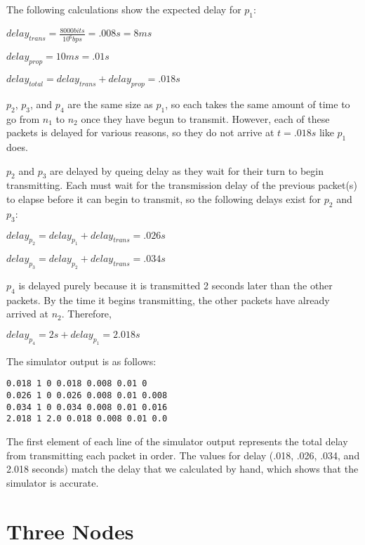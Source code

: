 \documentclass[11pt]{article}
\begin{document}
\begin{description}
The following calculations show the expected delay for $p_1$:

$delay_{trans} = \frac{8000 bits}{10^{6}bps} = .008s = 8ms$

$delay_{prop} = 10ms = .01s$

$delay_{total} = delay_{trans} + delay_{prop} = .018s $

$p_2$, $p_3$, and $p_4$ are the same size as $p_1$, so each takes the same amount of time to go from $n_1$ to $n_2$ once they have begun to transmit. However, each of these packets is delayed for various reasons, so they do not arrive at $t = .018s$ like $p_1$ does.

$p_2$ and $p_3$ are delayed by queing delay as they wait for their turn to begin transmitting. Each must wait for the transmission delay of the previous packet(s) to elapse before it can begin to transmit, so the following delays exist for $p_2$ and $p_3$:

$delay_{p_{2}} = delay_{p_{1}} + delay_{trans} = .026s$

$delay_{p_{3}} = delay_{p_{2}} + delay_{trans} = .034s$

$p_4$ is delayed purely because it is transmitted 2 seconds later than the other packets. By the time it begins transmitting, the other packets have already arrived at $n_2$. Therefore,

$delay_{p_{4}} = 2s + delay_{p_{1}} = 2.018s$

\medskip

The simulator output is as follows:

\medskip

\begin{lstlisting}
0.018 1 0 0.018 0.008 0.01 0
0.026 1 0 0.026 0.008 0.01 0.008
0.034 1 0 0.034 0.008 0.01 0.016
2.018 1 2.0 0.018 0.008 0.01 0.0
\end{lstlisting}

\medskip

The first element of each line of the simulator output represents the total delay from transmitting each packet in order. The values for delay (.018, .026, .034, and 2.018 seconds) match the delay that we calculated by hand, which shows that the simulator is accurate.

\end{description}

\section{Three Nodes}
\end{document}
